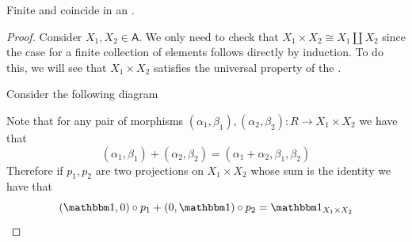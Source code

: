 \documentclass[../main.tex]{subfiles}
\begin{document}
\begin{lemma} \label{lemma:products-coproducts-additive}
  Finite  and  coincide in an .
\end{lemma}
\begin{proof}
  Consider \(X_{1}, X_{2} \in \mathsf{A}\). We only need to check that \(X_{1} \times X_{2} \cong X_{1} \amalg X_{2}\) since the case for a finite collection of elements follows directly by induction.
  To do this, we will see that \(X_{1} \times X_{2}\) satisfies the universal property of the .

  Consider the following diagram
  \begin{center}
  \end{center}

  Note that for any pair of morphisms \((\alpha_{1}, \beta_{1}), (\alpha_{2}, \beta_{2}): R \to X_{1} \times X_{2}\) we have that
  \begin{equation*}
    (\alpha_{1}, \beta_{1}) + (\alpha_{2}, \beta_{2}) = (\alpha_{1} + \alpha_{2}, \beta_{1}, \beta_{2})
  \end{equation*}
  Therefore if \(p_{1}, p_{2}\) are two projections on \(X_{1} \times X_{2}\) whose sum is the identity we have that
  \begin{equation*}
    (\id, 0) \circ p_{1} + (0, \id) \circ p_{2} = \id_{X_{1} \times X_{2}}
  \end{equation*}


\end{proof}
\end{document}
